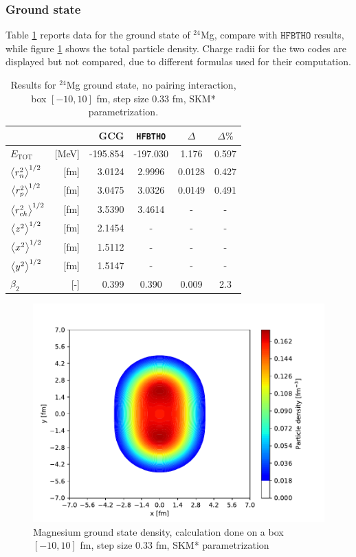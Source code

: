 \subsubsection{Ground state}
Table \ref{tab:mg_table} reports data for the ground state of $^{24}$Mg, compare with $\texttt{HFBTHO}$ results, while figure \ref{fig:mg_gs_density_axial} shows the total particle density.
Charge radii for the two codes are displayed but not compared, due to different formulas used for their computation.
\begin{table}[ht]
  \centering
  \begin{tabular}{lrrccc}
    \addlinespace[0.3em]
    \toprule
    && GCG & \texttt{HFBTHO} & $\Delta$ & $\Delta\%$ \\
    \midrule
    $E_{\text{TOT}}$& [MeV]    & -195.854 &-197.030 & 1.176 & 0.597 \\
    $\expval{ r^2_n}^{1/2}$    &[fm] & 3.0124    & 2.9996 & 0.0128  & 0.427\\
    $\expval{ r^2_p}^{1/2}$    &[fm] & 3.0475    & 3.0326  & 0.0149 & 0.491\\
    $\expval{ r^2_{ch}}^{1/2}$ &[fm] & 3.5390    & 3.4614  & - & - \\
    $\expval{z^2}^{1/2}$ &[fm] & 2.1454 &-  &- &-\\
    $\expval{x^2}^{1/2}$ &[fm] & 1.5112 &- & -&-\\
    $\expval{y^2}^{1/2}$ &[fm] & 1.5147 &- & -&-\\
    $\beta_2$ &[-] & 0.399 &0.390 & 0.009 & 2.3  \\
    \bottomrule
  \end{tabular}
  \caption{Results for $^{24}$Mg ground state, no pairing interaction, box $[-10, 10]$ fm, step size 0.33 fm, SKM* parametrization.}
  \label{tab:mg_table}
\end{table}
\begin{figure}[h]
  \centering
  \includegraphics[width=1.0\linewidth]{Images/mg_gs_density_axial.pdf}
  \caption{Magnesium ground state density, calculation done on a box $[-10, 10]$ fm, step size 0.33 fm, SKM* parametrization}
  \label{fig:mg_gs_density_axial}
\end{figure}

